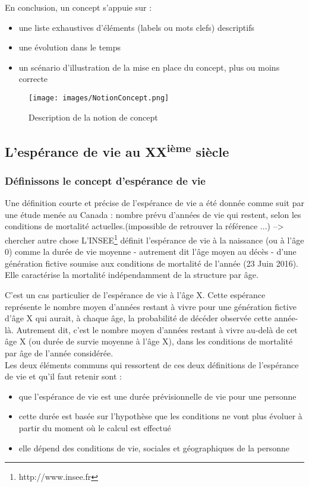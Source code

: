En conclusion, un concept s'appuie sur : 
\begin{itemize}
\item une liste exhaustives d'éléments (labels ou mots clefs) descriptifs
\item une évolution dans le temps
\item un scénario d'illustration de la mise en place du concept, plus ou moins correcte
\end{itemize}

\begin{figure}[htbp]%
\begin{center}
\texttt{[image: images/NotionConcept.png]} 
\end{center}
\caption{Description de la notion de concept}
\label{Description de la notion de concept}
\end{figure}


\subsection*{L'espérance de vie au XX\textsuperscript{ième} siècle}
\subsubsection*{Définissons le concept d'espérance de vie}

Une définition courte et précise de l'espérance de vie a été donnée comme suit par une étude menée au Canada : \og nombre prévu d'années de vie qui restent, selon les conditions de mortalité actuelles.\fg (impossible de retrouver la référence ...) --> chercher autre chose \newline \newline
L'INSEE\footnote{http://www.insee.fr} définit l'espérance de vie à la naissance (ou à l'âge 0) comme la durée de vie moyenne - autrement dit l'âge moyen au décès - d'une génération fictive soumise aux conditions de mortalité de l'année (23 Juin 2016). Elle caractérise la mortalité indépendamment de la structure par âge.


C'est un cas particulier de l'espérance de vie à l'âge X. Cette espérance représente le nombre moyen d'années restant à vivre pour une génération fictive d'âge X qui aurait, à chaque âge, la probabilité de décéder observée cette année-là.
Autrement dit, c'est le nombre moyen d'années restant à vivre au-delà de cet âge X (ou durée de survie moyenne à l'âge X), dans les conditions de mortalité par âge de l'année considérée.\\
Les deux éléments communs qui ressortent de ces deux définitions de l'espérance de vie et qu'il faut retenir sont : 
\begin{itemize}
\item que l'espérance de vie est une durée prévisionnelle de vie pour une personne
\item cette durée est basée sur l'hypothèse que les conditions ne vont plus évoluer à partir du moment où le calcul est effectué
\item elle dépend des conditions de vie, sociales et géographiques de la personne 
\end{itemize} 


